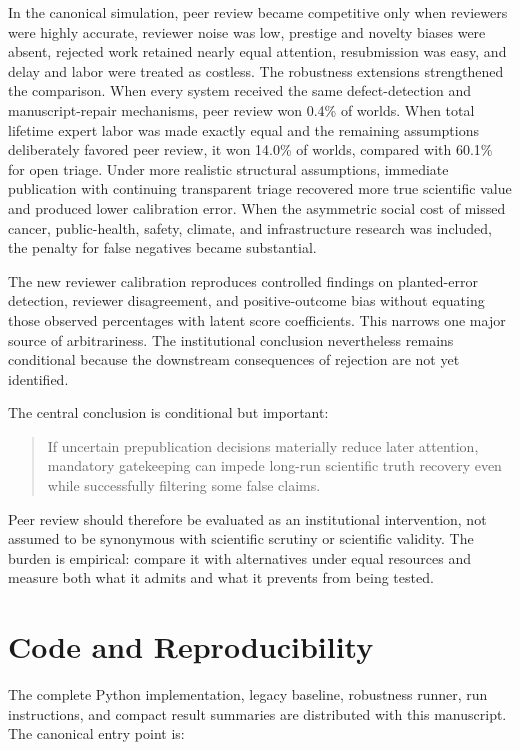 In the canonical simulation, peer review became competitive only when reviewers were highly accurate, reviewer noise was low, prestige and novelty biases were absent, rejected work retained nearly equal attention, resubmission was easy, and delay and labor were treated as costless. The robustness extensions strengthened the comparison. When every system received the same defect-detection and manuscript-repair mechanisms, peer review won 0.4\% of worlds. When total lifetime expert labor was made exactly equal and the remaining assumptions deliberately favored peer review, it won 14.0\% of worlds, compared with 60.1\% for open triage. Under more realistic structural assumptions, immediate publication with continuing transparent triage recovered more true scientific value and produced lower calibration error. When the asymmetric social cost of missed cancer, public-health, safety, climate, and infrastructure research was included, the penalty for false negatives became substantial.

The new reviewer calibration reproduces controlled findings on planted-error detection, reviewer disagreement, and positive-outcome bias without equating those observed percentages with latent score coefficients. This narrows one major source of arbitrariness. The institutional conclusion nevertheless remains conditional because the downstream consequences of rejection are not yet identified.

The central conclusion is conditional but important:

\begin{quote}
If uncertain prepublication decisions materially reduce later attention, mandatory gatekeeping can impede long-run scientific truth recovery even while successfully filtering some false claims.
\end{quote}

Peer review should therefore be evaluated as an institutional intervention, not assumed to be synonymous with scientific scrutiny or scientific validity. The burden is empirical: compare it with alternatives under equal resources and measure both what it admits and what it prevents from being tested.

\section*{Code and Reproducibility}

The complete Python implementation, legacy baseline, robustness runner, run instructions, and compact result summaries are distributed with this manuscript. The canonical entry point is:

